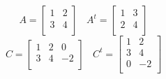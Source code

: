 \documentclass{article}
\begin{document}
    \begin{equation*}
        A = 
        \begin{bmatrix}
            1 & 2 \\
            3 & 4 \\
        \end{bmatrix} \ \ \ \
        A^t = 
        \begin{bmatrix}
            1 & 3 \\
            2 & 4 \\
        \end{bmatrix}
    \end{equation*}
    \newline
    \begin{equation*}
        C = 
        \begin{bmatrix}
            1 & 2 & 0\\
            3 & 4 & -2\\
        \end{bmatrix} \ \ \ \
        C^t = 
        \begin{bmatrix}
            1 & 2 \\
            3 & 4 \\
            0 & -2 \\
        \end{bmatrix}
    \end{equation*}
\end{document}
